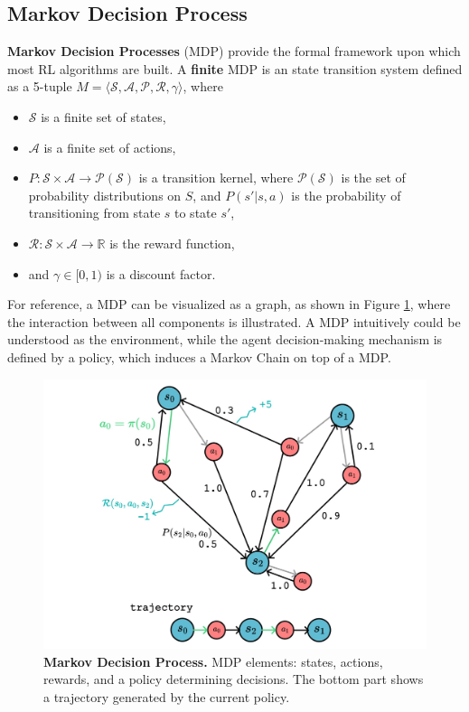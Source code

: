 \subsection{Markov Decision Process}
\label{sec:mdp_definition}

\textbf{Markov Decision Processes} (MDP) provide the formal framework upon which most RL algorithms are built. A \textbf{finite} MDP is an state transition system defined as a 5-tuple $M = \langle \mathcal{S}, \mathcal{A}, \mathcal{P}, \mathcal{R}, \gamma \rangle$, where 

\begin{itemize}
    \item $\mathcal{S}$ is a finite set of states,
    \item $\mathcal{A}$ is a finite set of actions,
    \item $P : \mathcal{S} \times \mathcal{A} \rightarrow \mathcal{P(S)}$ is a transition kernel, where $\mathcal{P(S)}$ is the set of probability distributions on $S$, and $P(s'|s, a)$ is the probability of transitioning from state $s$ to state $s'$,
    \item $\mathcal{R} : \mathcal{S} \times \mathcal{A}  \rightarrow \mathbb{R}$ is the reward function,
    \item and $\gamma \in [0, 1)$ is a discount factor.
\end{itemize}

For reference, a MDP can be visualized as a graph, as shown in Figure \ref{fig:mdp}, where the interaction between all components is illustrated. A MDP intuitively could be understood as the environment, while the agent decision-making mechanism is defined by a policy, which induces a Markov Chain on top of a MDP.

\begin{figure}[H]
    \centering
    \includegraphics[width=0.95\linewidth]{Figures/mdp.jpg}
    \caption[Markov Decision Process]{\textbf{Markov Decision Process.} MDP elements: states, actions, rewards, and a policy determining decisions. The bottom part shows a trajectory generated by the current policy.}
    \label{fig:mdp}
\end{figure}


